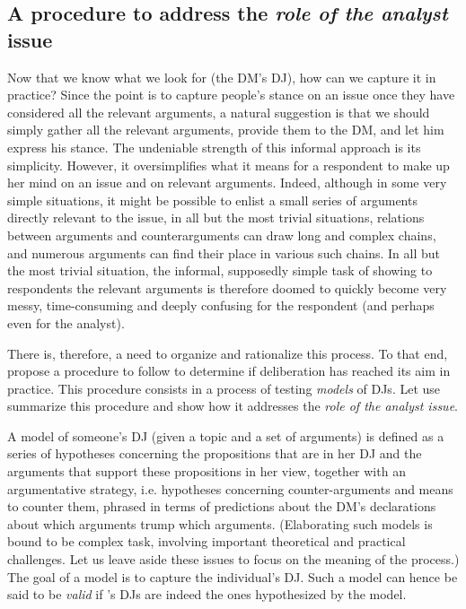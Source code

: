 \documentclass[version=3.21, pagesize, twoside=off, bibliography=totoc, DIV=calc, fontsize=12pt, a4paper, french, english]{scrartcl}
\begin{document}
\subsection{A procedure to address the \emph{role of the analyst} issue}
Now that we know what we look for (the \ac{DM}'s \ac{DJ}), how can we capture it in practice? Since the point is to capture people’s stance on an issue once they have considered all the relevant arguments, a natural suggestion is that we should simply gather all the relevant arguments, provide them to the \ac{DM}, and let him express his stance. The undeniable strength of this informal approach is its simplicity. However, it oversimplifies what it means for a respondent to make up her mind on an issue and on relevant arguments. Indeed, although in some very simple situations, it might be possible to enlist a small series of arguments directly relevant to the issue, in all but the most trivial situations, relations between arguments and counterarguments can draw long and complex chains, and numerous arguments can find their place in various such chains. In all but the most trivial situation, the informal, supposedly simple task of showing to respondents the relevant arguments is therefore doomed to quickly become very messy, time-consuming and deeply confusing for the respondent (and perhaps even for the analyst).

There is, therefore, a need to organize and rationalize this process. To that end,  propose a procedure to follow to determine if deliberation has reached its aim in practice. This procedure consists in a process of testing \emph{models} of \acp{DJ}. Let use summarize this procedure and show how it addresses the \emph{role of the analyst issue}.

A model of someone’s \ac{DJ} (given a topic and a set of arguments) is defined as a series of hypotheses concerning the propositions that are in her \ac{DJ} and the arguments that support these propositions in her view, together with an argumentative strategy, i.e. hypotheses concerning counter-arguments and means to counter them, phrased in terms of predictions about the \ac{DM}’s declarations about which arguments trump which arguments. (Elaborating such models is bound to be complex task, involving important theoretical and practical challenges. Let us leave aside these issues to focus on the meaning of the process.) The goal of a model is to capture the individual’s \ac{DJ}. Such a model can hence be said to be \emph{valid} if \thedm’s \acp{DJ} are indeed the ones hypothesized by the model.
\end{document}
